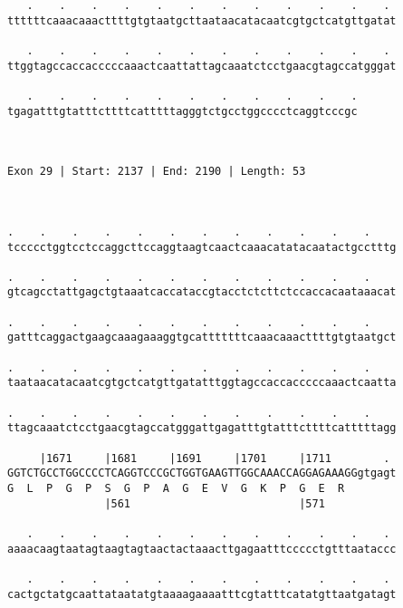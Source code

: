 \documentclass{article}
\begin{document}
\begin{Verbatim}
   .    .    .    .    .    .    .    .    .    .    .    . 
ttttttcaaacaaacttttgtgtaatgcttaataacatacaatcgtgctcatgttgatat
                                                            
   .    .    .    .    .    .    .    .    .    .    .    . 
ttggtagccaccacccccaaactcaattattagcaaatctcctgaacgtagccatgggat
                                                            
   .    .    .    .    .    .    .    .    .    .    .
tgagatttgtatttcttttcatttttagggtctgcctggcccctcaggtcccgc
                                                      
                                                      
 
Exon 29 | Start: 2137 | End: 2190 | Length: 53



.    .    .    .    .    .    .    .    .    .    .    .    
tccccctggtcctccaggcttccaggtaagtcaactcaaacatatacaatactgcctttg
                                                            
.    .    .    .    .    .    .    .    .    .    .    .    
gtcagcctattgagctgtaaatcaccataccgtacctctcttctccaccacaataaacat
                                                            
.    .    .    .    .    .    .    .    .    .    .    .    
gatttcaggactgaagcaaagaaaggtgcatttttttcaaacaaacttttgtgtaatgct
                                                            
.    .    .    .    .    .    .    .    .    .    .    .    
taataacatacaatcgtgctcatgttgatatttggtagccaccacccccaaactcaatta
                                                            
.    .    .    .    .    .    .    .    .    .    .    .    
ttagcaaatctcctgaacgtagccatgggattgagatttgtatttcttttcatttttagg
                                                            
     |1671     |1681     |1691     |1701     |1711        . 
GGTCTGCCTGGCCCCTCAGGTCCCGCTGGTGAAGTTGGCAAACCAGGAGAAAGGgtgagt
G  L  P  G  P  S  G  P  A  G  E  V  G  K  P  G  E  R        
               |561                          |571           
  
   .    .    .    .    .    .    .    .    .    .    .    . 
aaaacaagtaatagtaagtagtaactactaaacttgagaatttccccctgtttaataccc
                                                            
   .    .    .    .    .    .    .    .    .    .    .    . 
cactgctatgcaattataatatgtaaaagaaaatttcgtatttcatatgttaatgatagt
                                                            

\end{Verbatim}
\end{document}
